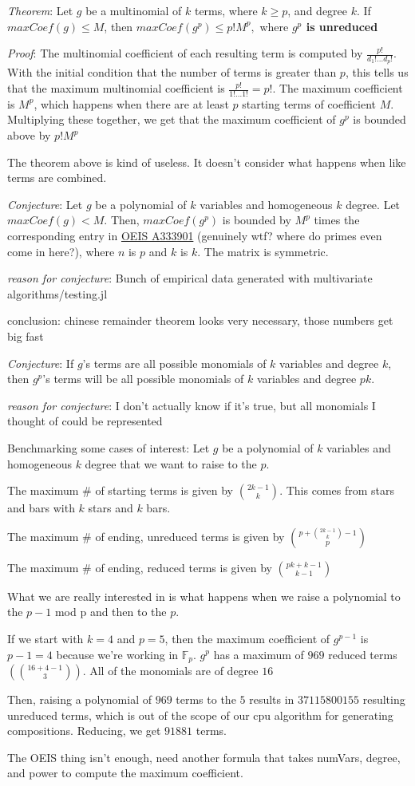 \documentclass{article}
\begin{document}
\textit{Theorem}: Let $g$ be a multinomial of $k$ terms, where $k \ge p$, and degree $k$. If $maxCoef(g) \le M$, then $maxCoef(g^p) \le p! M^p,$ where \textbf{$g^p$ is unreduced}

\textit{Proof}: The multinomial coefficient of each resulting term is computed by $\frac{p!}{d_{1}!...d_{p}!}$. With the initial condition that the number of terms is greater than $p$, this tells us that the maximum multinomial coefficient is $\frac{p!}{1!...1!} = p!$. The maximum coefficient is $M^p$, which happens when there are at least $p$ starting terms of coefficient $M$. Multiplying these together, we get that the maximum coefficient of $g^p$ is bounded above by $p! M^p$

The theorem above is kind of useless. It doesn't consider what happens when like terms are combined.

\textit{Conjecture}: Let $g$ be a polynomial of $k$ variables and homogeneous $k$ degree. Let $maxCoef(g) < M$. Then, $maxCoef(g^p)$ is bounded by $M^p$ times the corresponding entry in \href{https://oeis.org/A333901/internal}{OEIS A333901} (genuinely wtf? where do primes even come in here?), where $n$ is $p$ and $k$ is $k$. The matrix is symmetric.

\textit{reason for conjecture}: Bunch of empirical data generated with multivariate algorithms/testing.jl

conclusion: chinese remainder theorem looks very necessary, those numbers get big fast

\textit{Conjecture}: If $g$'s terms are all possible monomials of $k$ variables and degree $k$, then $g^p$'s terms will be all possible monomials of $k$ variables and degree $pk$.

\textit{reason for conjecture}: I don't actually know if it's true, but all monomials I thought of could be represented

Benchmarking some cases of interest:
Let $g$ be a polynomial of $k$ variables and homogeneous $k$ degree that we want to raise to the $p$.

The maximum \# of starting terms is given by $\binom{2k-1}{k}$. This comes from stars and bars with $k$ stars and $k$ bars.

The maximum \# of ending, unreduced terms is given by $\binom{p + \binom{2k-1}{k} - 1}{p}$

The maximum \# of ending, reduced terms is given by $\binom{pk + k - 1}{k - 1}$

What we are really interested in is what happens when we raise a polynomial to the $p-1$ mod p and then to the $p$.

If we start with $k = 4$ and $p = 5$, then the maximum coefficient of $g^{p-1}$ is $p - 1 = 4$ because we're working in $\mathbb{F}_p$. $g^p$ has a maximum of $969$ reduced terms $(\binom{16+4-1}{3})$. All of the monomials are of degree $16$

Then, raising a polynomial of $969$ terms to the $5$ results in $37115800155$ resulting unreduced terms, which is out of the scope of our cpu algorithm for generating compositions. Reducing, we get $91881$ terms.

The OEIS thing isn't enough, need another formula that takes numVars, degree, and power to compute the maximum coefficient.
\end{document}
